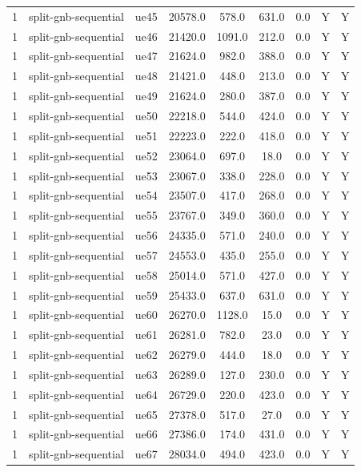 \begin{table}[ht]
\begin{tabular}{|c|c|c|c|c|c|c|c|c|}
1 & split-gnb-sequential & ue45 & 20578.0 & 578.0 & 631.0 & 0.0 & Y & Y \\
1 & split-gnb-sequential & ue46 & 21420.0 & 1091.0 & 212.0 & 0.0 & Y & Y \\
1 & split-gnb-sequential & ue47 & 21624.0 & 982.0 & 388.0 & 0.0 & Y & Y \\
1 & split-gnb-sequential & ue48 & 21421.0 & 448.0 & 213.0 & 0.0 & Y & Y \\
1 & split-gnb-sequential & ue49 & 21624.0 & 280.0 & 387.0 & 0.0 & Y & Y \\
1 & split-gnb-sequential & ue50 & 22218.0 & 544.0 & 424.0 & 0.0 & Y & Y \\
1 & split-gnb-sequential & ue51 & 22223.0 & 222.0 & 418.0 & 0.0 & Y & Y \\
1 & split-gnb-sequential & ue52 & 23064.0 & 697.0 & 18.0 & 0.0 & Y & Y \\
1 & split-gnb-sequential & ue53 & 23067.0 & 338.0 & 228.0 & 0.0 & Y & Y \\
1 & split-gnb-sequential & ue54 & 23507.0 & 417.0 & 268.0 & 0.0 & Y & Y \\
1 & split-gnb-sequential & ue55 & 23767.0 & 349.0 & 360.0 & 0.0 & Y & Y \\
1 & split-gnb-sequential & ue56 & 24335.0 & 571.0 & 240.0 & 0.0 & Y & Y \\
1 & split-gnb-sequential & ue57 & 24553.0 & 435.0 & 255.0 & 0.0 & Y & Y \\
1 & split-gnb-sequential & ue58 & 25014.0 & 571.0 & 427.0 & 0.0 & Y & Y \\
1 & split-gnb-sequential & ue59 & 25433.0 & 637.0 & 631.0 & 0.0 & Y & Y \\
1 & split-gnb-sequential & ue60 & 26270.0 & 1128.0 & 15.0 & 0.0 & Y & Y \\
1 & split-gnb-sequential & ue61 & 26281.0 & 782.0 & 23.0 & 0.0 & Y & Y \\
1 & split-gnb-sequential & ue62 & 26279.0 & 444.0 & 18.0 & 0.0 & Y & Y \\
1 & split-gnb-sequential & ue63 & 26289.0 & 127.0 & 230.0 & 0.0 & Y & Y \\
1 & split-gnb-sequential & ue64 & 26729.0 & 220.0 & 423.0 & 0.0 & Y & Y \\
1 & split-gnb-sequential & ue65 & 27378.0 & 517.0 & 27.0 & 0.0 & Y & Y \\
1 & split-gnb-sequential & ue66 & 27386.0 & 174.0 & 431.0 & 0.0 & Y & Y \\
1 & split-gnb-sequential & ue67 & 28034.0 & 494.0 & 423.0 & 0.0 & Y & Y \\

\end{tabular}
\end{table}
